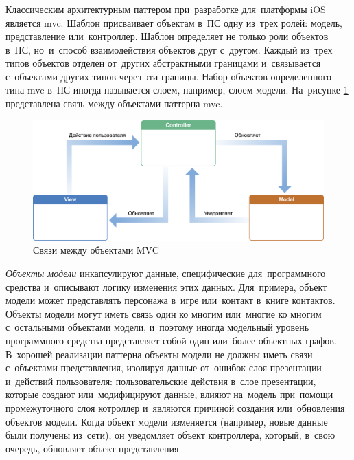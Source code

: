 \subsubsection {}
\label{sec:analysis:research:mobArch:mvc}

Классическим архитектурным паттером при~разработке для~платформы iOS является \gls{mvc}. Шаблон присваивает объектам в~ПС одну из~трех ролей: модель, представление или~контроллер. Шаблон определяет не только роли объектов в~ПС, но~и~способ взаимодействия объектов друг с~другом. Каждый из~трех типов объектов отделен от~других абстрактными границами и~связывается с~объектами других типов через эти границы. Набор объектов определенного типа \gls{mvc} в~ПС иногда называется слоем, например, слоем модели\cite{apple:mvc}. На~рисунке \ref{sec:analysis:research:mobArch:apple-mvc:image:mvc} представлена связь между объектами паттерна \gls{mvc}.

\begin{figure}[h]
  \centering
    \includegraphics[width=1\textwidth]{inc/img/mvc.png}
  \caption{Связи между объектами MVC}
  \label{sec:analysis:research:mobArch:apple-mvc:image:mvc}
\end{figure}

\emph{Объекты модели} инкапсулируют данные, специфические для~программного средства и~описывают логику изменения этих данных. Для~примера, объект модели может представлять персонажа в~игре или~контакт в~книге контактов. Объекты модели могут иметь связь один ко многим или~многие ко многим с~остальными объектами модели, и~поэтому иногда модельный уровень программного средства представляет собой один или~более объектных графов. В~хорошей реализации паттерна объекты модели не должны иметь связи с~объектами представления, изолируя данные от~ошибок слоя презентации и~действий пользователя: пользовательские действия в~слое презентации, которые создают или~модифицируют данные, влияют на~модель при~помощи промежуточного слоя котроллер и~являются причиной создания или~обновления объектов модели. Когда объект модели изменяется (например, новые данные были получены из~сети), он уведомляет объект контроллера, который, в~свою очередь, обновляет объект представления.


